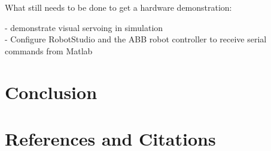 \documentclass{UoNMCHA}
\numberwithin{equation}{section}
\begin{document}
What still needs to be done to get a hardware demonstration: 

- demonstrate visual servoing in simulation \\
- Configure RobotStudio and the ABB robot controller to receive serial commands from Matlab\\





\section{Conclusion}\label{sec:Conclusion}

\section{References and Citations}\label{sec:RefCite}


\end{document}
